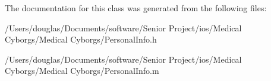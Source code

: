 The documentation for this class was generated from the following files\-:\begin{DoxyCompactItemize}
\item 
/\-Users/douglas/\-Documents/software/\-Senior Project/ios/\-Medical Cyborgs/\-Medical Cyborgs/Personal\-Info.\-h\item 
/\-Users/douglas/\-Documents/software/\-Senior Project/ios/\-Medical Cyborgs/\-Medical Cyborgs/Personal\-Info.\-m\end{DoxyCompactItemize}
